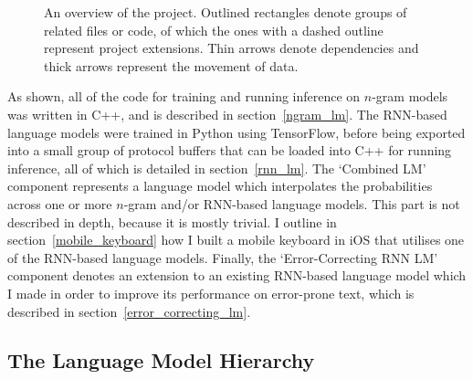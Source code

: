 \documentclass[a4paper, 12pt]{report}
\begin{document}
\begin{figure}[h]
\begin{adjustbox}{center}
\end{adjustbox}
\caption{An overview of the project. Outlined rectangles denote groups of related files or code, of which the ones with a dashed outline represent project extensions. Thin arrows denote dependencies and thick arrows represent the movement of data.}
\label{fig:system_overview}
\end{figure}

As shown, all of the code for training and running inference on $n$-gram models was written in C++, and is described in section~\ref{ngram_lm}. The RNN-based language models were trained in Python using TensorFlow, before being exported into a small group of protocol buffers that can be loaded into C++ for running inference, all of which is detailed in section~\ref{rnn_lm}. The `Combined LM' component represents a language model which interpolates the probabilities across one or more $n$-gram and/or RNN-based language models. This part is not described in depth, because it is mostly trivial. I outline in section~\ref{mobile_keyboard} how I built a mobile keyboard in iOS that utilises one of the RNN-based language models. Finally, the `Error-Correcting RNN LM' component denotes an extension to an existing RNN-based language model which I made in order to improve its performance on error-prone text, which is described in section~\ref{error_correcting_lm}. \\

\subsection{The Language Model Hierarchy} \label{lm_interface}
\end{document}
